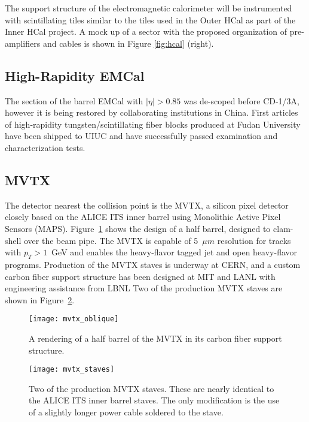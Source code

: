 The support structure of the electromagnetic calorimeter will be
instrumented with scintillating tiles similar to the tiles used in the
Outer HCal as part of the Inner HCal project.  A mock up of a sector
with the proposed organization of pre-amplifiers and cables is shown
in Figure \ref{fig:hcal} (right).

\subsection{High-Rapidity EMCal} 

The section of the barrel EMCal with $|\eta|>0.85$ was de-scoped
before CD-1/3A, however it is being restored by collaborating
institutions in China.  First articles of high-rapidity
tungsten/scintillating fiber blocks produced at Fudan University have
been shipped to UIUC and have successfully passed examination and
characterization tests.

\subsection{MVTX}

The detector nearest the collision point is the MVTX, a silicon pixel
detector closely based on the ALICE ITS inner barrel using Monolithic
Active Pixel Sensors (MAPS).  Figure~\ref{fig:mvtx_oblique} shows the
design of a half barrel, designed to clam-shell over the beam pipe.
The MVTX is capable of 5~$\mu m$ resolution for tracks with
$p_T > 1$~GeV and enables the heavy-flavor tagged jet and open
heavy-flavor programs.  Production of the MVTX staves is underway at
CERN, and a custom carbon fiber support structure has been designed at
MIT and LANL with engineering assistance from LBNL Two of the
production MVTX staves are shown in Figure~\ref{fig:mvtx_staves}.

\begin{figure}[hbt!]
  \centering
  \texttt{[image: mvtx\_oblique]}
  \caption{A rendering of a half barrel of the MVTX in its carbon
    fiber support structure.}
  \label{fig:mvtx_oblique}
\end{figure}

\begin{figure}[hbt!]
  \centering
  \texttt{[image: mvtx\_staves]}
  \caption{Two of the production MVTX staves.  These are nearly
    identical to the ALICE ITS inner barrel staves.  The only
    modification is the use of a slightly longer power cable soldered
    to the stave.}
  \label{fig:mvtx_staves}
\end{figure}

